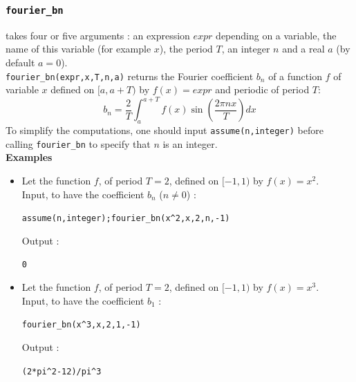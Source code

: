 \documentclass[a4paper,11pt]{book}
\begin{document}
\subsubsection{\tt fourier\_bn}\label{sec:fourier_bn}
 takes four or five arguments : an expression $expr$
depending on a variable, the name of this variable (for example $x$), the 
period $T$, an integer $n$ and a real $a$ (by default $a=0$).\\
{\tt fourier\_bn(expr,x,T,n,a)} returns the Fourier coefficient $b_n$ of a 
function $f$ of variable $x$ defined on $[a,a+T)$ by $f(x)=expr$ and  periodic 
of period $T$:
$$\displaystyle b_n=\frac{2}{T}\int_a^{a+T}f(x)\sin(\frac{2\pi nx}{T})dx$$
To simplify the computations, one should input {\tt assume(n,integer)} 
before calling {\tt fourier\_bn} to specify that $n$ is an integer.\\
{\bf Examples} 
\begin{itemize}
\item Let the function $f$, of period $T=2$, defined on $[-1,1)$ by 
$f(x)=x^2$.\\
Input, to have the coefficient $b_n$ ($n\neq 0$) :
 \begin{center}{\tt  assume(n,integer);fourier\_bn(x\verb|^|2,x,2,n,-1)}\end{center}
Output :
\begin{center}{\tt  0}\end{center}

\item Let the function $f$, of period $T=2$, defined on $[-1,1)$ by
$f(x)=x^3$.\\
Input, to have the coefficient  $b_1$ :
 \begin{center}{\tt fourier\_bn(x\verb|^|3,x,2,1,-1)}\end{center}
Output :
\begin{center}{\tt (2*pi\verb|^|2-12)/pi\verb|^|3}\end{center}
\end{itemize}
\end{document}
